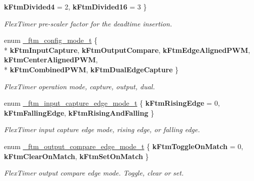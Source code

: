 \begin{DoxyCompactItemize}
{\bfseries k\+Ftm\+Divided4} = 2, 
{\bfseries k\+Ftm\+Divided16} = 3
 \}\hypertarget{group__ftm__hal_gad9f0fd5973baa099b25d10bf325c572d}{}\label{group__ftm__hal_gad9f0fd5973baa099b25d10bf325c572d}
\begin{DoxyCompactList}\small\item\em Flex\+Timer pre-\/scaler factor for the deadtime insertion. \end{DoxyCompactList}
\item 
enum \hyperlink{group__ftm__hal_ga28d1183ea739cf9ce4983d04677ce6a5}{\+\_\+ftm\+\_\+config\+\_\+mode\+\_\+t} \{ \\*
{\bfseries k\+Ftm\+Input\+Capture}, 
{\bfseries k\+Ftm\+Output\+Compare}, 
{\bfseries k\+Ftm\+Edge\+Aligned\+P\+WM}, 
{\bfseries k\+Ftm\+Center\+Aligned\+P\+WM}, 
\\*
{\bfseries k\+Ftm\+Combined\+P\+WM}, 
{\bfseries k\+Ftm\+Dual\+Edge\+Capture}
 \}\hypertarget{group__ftm__hal_ga28d1183ea739cf9ce4983d04677ce6a5}{}\label{group__ftm__hal_ga28d1183ea739cf9ce4983d04677ce6a5}
\begin{DoxyCompactList}\small\item\em Flex\+Timer operation mode, capture, output, dual. \end{DoxyCompactList}
\item 
enum \hyperlink{group__ftm__hal_ga9de4f09983cfb6995327d3d4df7061be}{\+\_\+ftm\+\_\+input\+\_\+capture\+\_\+edge\+\_\+mode\+\_\+t} \{ {\bfseries k\+Ftm\+Rising\+Edge} = 0, 
{\bfseries k\+Ftm\+Falling\+Edge}, 
{\bfseries k\+Ftm\+Rising\+And\+Falling}
 \}\hypertarget{group__ftm__hal_ga9de4f09983cfb6995327d3d4df7061be}{}\label{group__ftm__hal_ga9de4f09983cfb6995327d3d4df7061be}
\begin{DoxyCompactList}\small\item\em Flex\+Timer input capture edge mode, rising edge, or falling edge. \end{DoxyCompactList}
\item 
enum \hyperlink{group__ftm__hal_ga8d694b53bad7bd40f7c79f45ad0ea0cd}{\+\_\+ftm\+\_\+output\+\_\+compare\+\_\+edge\+\_\+mode\+\_\+t} \{ {\bfseries k\+Ftm\+Toggle\+On\+Match} = 0, 
{\bfseries k\+Ftm\+Clear\+On\+Match}, 
{\bfseries k\+Ftm\+Set\+On\+Match}
 \}\hypertarget{group__ftm__hal_ga8d694b53bad7bd40f7c79f45ad0ea0cd}{}\label{group__ftm__hal_ga8d694b53bad7bd40f7c79f45ad0ea0cd}
\begin{DoxyCompactList}\small\item\em Flex\+Timer output compare edge mode. Toggle, clear or set. \end{DoxyCompactList}

\end{DoxyCompactItemize}
